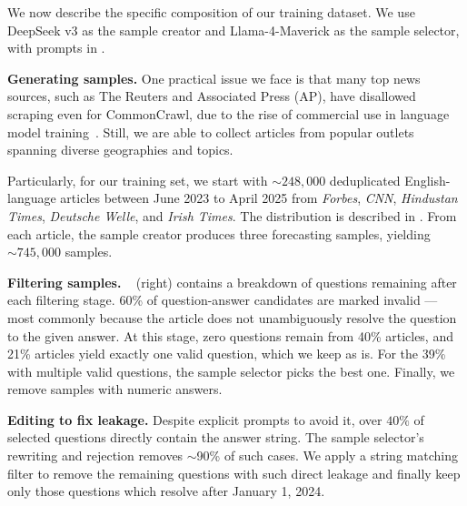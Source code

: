 We now describe the specific composition of our training dataset. We use DeepSeek v3 as the sample creator and Llama-4-Maverick as the sample selector, with prompts in .

\textbf{Generating samples.} One practical issue we face is that many top news sources, such as The Reuters and Associated Press (AP), have disallowed scraping even for CommonCrawl, due to the rise of commercial use in language model training~\citep{grynbaum2023times,longpre_consent_2025}. Still, we are able to collect articles from popular outlets spanning diverse geographies and topics. 

Particularly, for our training set, we start with $\sim248,000$ deduplicated English-language articles between June 2023 to April 2025 from \emph{Forbes}, \emph{CNN}, \emph{Hindustan Times}, \emph{Deutsche Welle}, and \emph{Irish Times}. The distribution is described in . From each article, the sample creator produces three forecasting samples, yielding $\sim745,000$ samples. \vspace{0.15cm}

\textbf{Filtering samples.} ~ (right) contains a breakdown of questions remaining after each filtering stage. 60\% of question-answer candidates are marked invalid --- most commonly because the article does not unambiguously resolve the question to the given answer. At this stage, zero questions remain from 40\% articles, and 21\% articles yield exactly one valid question, which we keep as is. For the 39\% with multiple valid questions, the sample selector picks the best one. Finally, we remove samples with numeric answers.\vspace{0.15cm}

 \textbf{Editing to fix leakage.} Despite explicit prompts to avoid it, over $40\%$ of selected questions directly contain the answer string. The sample selector's rewriting and rejection removes $\sim$90\% of such cases. We apply a string matching filter to remove the remaining questions with such direct leakage and finally keep only those questions which resolve after January 1, 2024. 

